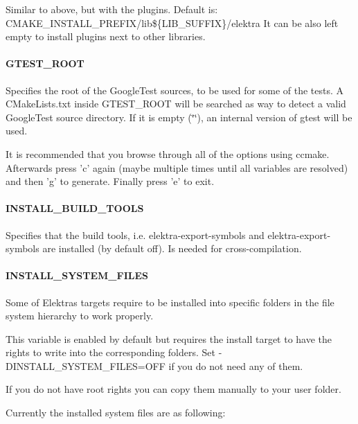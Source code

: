 Similar to above, but with the plugins. Default is\+: {\ttfamily C\+M\+A\+K\+E\+\_\+\+I\+N\+S\+T\+A\+L\+L\+\_\+\+P\+R\+E\+F\+I\+X/lib\$\{L\+I\+B\+\_\+\+S\+U\+F\+F\+I\+X\}/elektra} It can be also left empty to install plugins next to other libraries.

\paragraph*{G\+T\+E\+S\+T\+\_\+\+R\+O\+O\+T}

Specifies the root of the Google\+Test sources, to be used for some of the tests. A {\ttfamily C\+Make\+Lists.\+txt} inside {\ttfamily G\+T\+E\+S\+T\+\_\+\+R\+O\+O\+T} will be searched as way to detect a valid Google\+Test source directory. If it is empty ({\ttfamily \char`\"{}\char`\"{}}), an internal version of gtest will be used.

It is recommended that you browse through all of the options using ccmake. Afterwards press 'c' again (maybe multiple times until all variables are resolved) and then 'g' to generate. Finally press 'e' to exit.

\paragraph*{I\+N\+S\+T\+A\+L\+L\+\_\+\+B\+U\+I\+L\+D\+\_\+\+T\+O\+O\+L\+S}

Specifies that the build tools, i.\+e. {\ttfamily elektra-\/export-\/symbols} and {\ttfamily elektra-\/export-\/symbols} are installed (by default off). Is needed for cross-\/compilation.

\paragraph*{I\+N\+S\+T\+A\+L\+L\+\_\+\+S\+Y\+S\+T\+E\+M\+\_\+\+F\+I\+L\+E\+S}

Some of Elektras targets require to be installed into specific folders in the file system hierarchy to work properly.

This variable is enabled by default but requires the install target to have the rights to write into the corresponding folders. Set {\ttfamily -\/\+D\+I\+N\+S\+T\+A\+L\+L\+\_\+\+S\+Y\+S\+T\+E\+M\+\_\+\+F\+I\+L\+E\+S=O\+F\+F} if you do not need any of them.

If you do not have root rights you can copy them manually to your user folder.

Currently the installed system files are as following\+:

